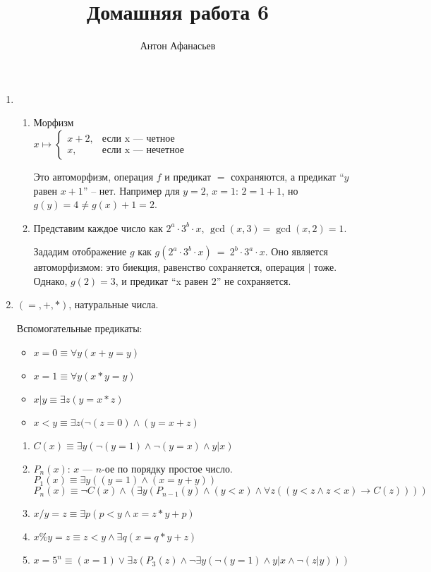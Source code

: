 \documentclass[10pt]{article}
\begin{document}
\title{Домашняя работа 6}
\author{Антон Афанасьев}
\maketitle

\begin{enumerate}

	\item 
	\begin{enumerate}
		\item Морфизм\\ $ x \mapsto \begin{cases}
		x+2,&\text{если x --- четное}\\
		x,&\text{если x --- нечетное}
		\end{cases}$
		
		Это автоморфизм, операция $f$ и предикат $=$ сохраняются, а предикат ``$y$ равен $x+1$'' -- нет. Например для $y=2$, $x=1$: $2=1+1$, но $g(y) = 4 \neq g(x)+1 = 2$.
		
		\item Представим каждое число как $2^a \cdot 3^b \cdot x$, $\gcd(x, 3)=\gcd(x, 2)=1$. 
		
		Зададим отображение $g$ как $g(2^a \cdot 3^b \cdot x)~=~2^b \cdot 3^a \cdot x$. Оно является автоморфизмом: это биекция, равенство сохраняется, операция $|$ тоже. Однако, $g(2) = 3$, и предикат ``x равен 2'' не сохраняется.
	\end{enumerate}
	
	\item $(=, +, *)$, натуральные числа.
	
	Вспомогательные предикаты:
	\begin{itemize}
		\item $x = 0 \equiv \forall y (x+y = y)$
		\item $x = 1 \equiv \forall y (x*y = y)$
		\item $x | y \equiv \exists z(y = x*z)$
		\item $x < y \equiv \exists z(\neg(z=0) \land (y = x+z)$
	\end{itemize}
	
	\begin{enumerate}
		\item $C(x) \equiv \exists y (\neg(y=1) \land \neg(y = x) \land y|x)$
		\item $P_n(x)$: $x$ --- $n$-ое по порядку простое число.\\
		$P_1(x) \equiv \exists y((y=1) \land (x = y+y))$\\
		$P_n(x) \equiv \neg C(x) \land (\exists y(P_{n-1}(y) \land (y<x) \land \forall z((y<z \land z < x) \to C(z))))$
		\item $x/y = z \equiv \exists p (p<y \land x = z*y + p)$
		\item $x\%y = z \equiv z<y \land \exists q(x = q*y + z)$
		\item $x=5^n \equiv (x=1) \lor \exists z(P_3(z) \land \neg \exists y (\neg(y=1) \land y|x \land \neg(z|y)))$
	\end{enumerate}


\end{enumerate}
\end{document}
